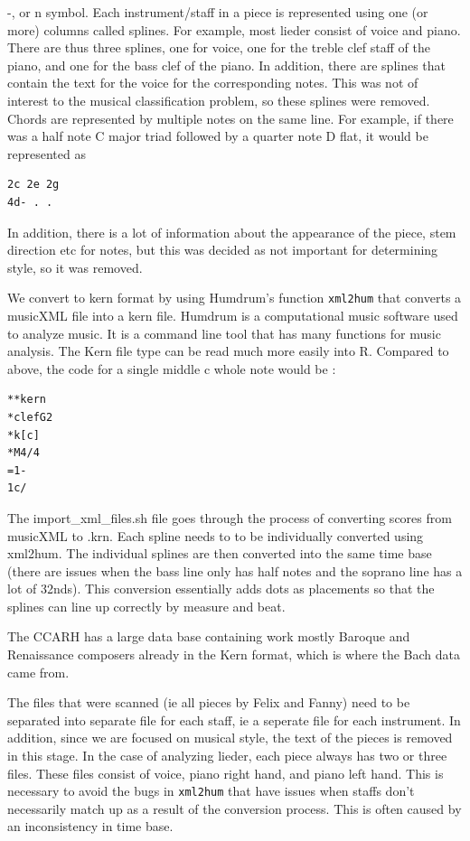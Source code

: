 \documentclass[12pt,twoside]{reedthesis}
\theoremstyle{definition}
\theoremstyle{definition}
\theoremstyle{definition}
\theoremstyle{remark}
\begin{document}
-, or n symbol. Each instrument/staff in a piece is represented using
one (or more) columns called splines. For example, most lieder consist
of voice and piano. There are thus three splines, one for voice, one for
the treble clef staff of the piano, and one for the bass clef of the
piano. In addition, there are splines that contain the text for the
voice for the corresponding notes. This was not of interest to the
musical classification problem, so these splines were removed. Chords
are represented by multiple notes on the same line. For example, if
there was a half note C major triad followed by a quarter note D flat,
it would be represented as
\begin{verbatim}
2c 2e 2g
4d- . . 
\end{verbatim}
In addition, there is a lot of information about the appearance of the
piece, stem direction etc for notes, but this was decided as not
important for determining style, so it was removed.

We convert to kern format by using Humdrum's function \texttt{xml2hum}
that converts a musicXML file into a kern file. Humdrum is a
computational music software used to analyze music. It is a command line
tool that has many functions for music analysis. The Kern file type can
be read much more easily into R. Compared to above, the code for a
single middle c whole note would be :
\begin{verbatim}
**kern
*clefG2
*k[c]
*M4/4
=1-
1c/
\end{verbatim}
The import\_xml\_files.sh file goes through the process of converting
scores from musicXML to .krn. Each spline needs to to be individually
converted using xml2hum. The individual splines are then converted into
the same time base (there are issues when the bass line only has half
notes and the soprano line has a lot of 32nds). This conversion
essentially adds dots as placements so that the splines can line up
correctly by measure and beat.

The CCARH has a large data base containing work mostly Baroque and
Renaissance composers already in the Kern format, which is where the
Bach data came from.

The files that were scanned (ie all pieces by Felix and Fanny) need to
be separated into separate file for each staff, ie a seperate file for
each instrument. In addition, since we are focused on musical style, the
text of the pieces is removed in this stage. In the case of analyzing
lieder, each piece always has two or three files. These files consist of
voice, piano right hand, and piano left hand. This is necessary to avoid
the bugs in \texttt{xml2hum} that have issues when staffs don't
necessarily match up as a result of the conversion process. This is
often caused by an inconsistency in time base.
\end{document}
